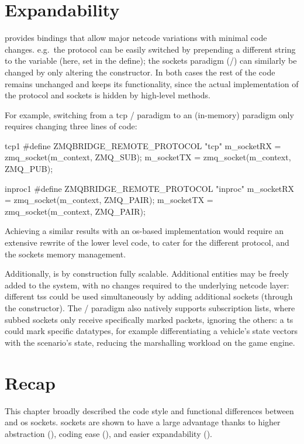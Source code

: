 \section{Expandability}\label{sc:code:expandability}

 provides bindings that allow major \gls{netcode} variations with minimal code changes. e.g.\ the protocol can be easily switched by prepending a different string to the  variable (here, set in the  define); the sockets paradigm (/) can similarly be changed by only altering the constructor. In both cases the rest of the code remains unchanged and keeps its functionality, since the actual implementation of the protocol and sockets is hidden by high-level methods.

For example, switching from a \gls{tcp} / paradigm to an  (in-memory)  paradigm only requires changing three lines of code:

\begin{codelist}{\gls{tcp}}{1}
#define ZMQBRIDGE_REMOTE_PROTOCOL "tcp"
m_socketRX = zmq_socket(m_context, ZMQ_SUB);
m_socketTX = zmq_socket(m_context, ZMQ_PUB);
\end{codelist}

\begin{codelist}{inproc}{1}
#define ZMQBRIDGE_REMOTE_PROTOCOL "inproc"
m_socketRX = zmq_socket(m_context, ZMQ_PAIR);
m_socketTX = zmq_socket(m_context, ZMQ_PAIR);
\end{codelist}

\FLOATnoindent Achieving a similar results with an \gls{os}-based implementation would require an extensive rewrite of the lower level code, to cater for the different protocol, and the sockets memory management.

Additionally,  is by construction fully scalable. Additional entities may be freely added to the system, with no changes required to the underlying \gls{netcode} layer: different \glspl{ts} could be used simultaneously by adding additional sockets (through the  constructor). The  / paradigm also natively supports subscription lists, where subbed sockets only receive specifically marked packets, ignoring the others: a \gls{ts} could mark specific datatypes, for example differentiating a vehicle's state vectors with the scenario's state, reducing the marshalling workload on the game engine.

\section{Recap}\label{sc:code:recap}

This chapter broadly described the code style and functional differences between  and \gls{os} sockets.  sockets are shown to have a large advantage thanks to higher abstraction (), coding ease (), and easier expandability ().
